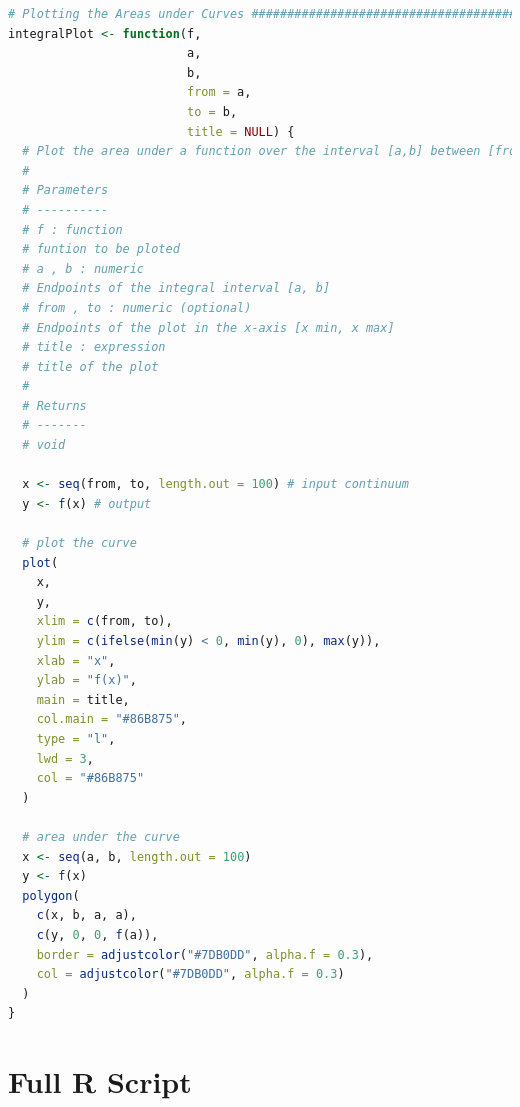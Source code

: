 \documentclass[11pt,a4paper]{article}
\begin{document}
\begin{lstlisting}[frame=trBL, language=R]
# Plotting the Areas under Curves ######################################
integralPlot <- function(f,
                         a,
                         b,
                         from = a,
                         to = b,
                         title = NULL) {
  # Plot the area under a function over the interval [a,b] between [from,to].
  #
  # Parameters
  # ----------
  # f : function
  # funtion to be ploted
  # a , b : numeric
  # Endpoints of the integral interval [a, b]
  # from , to : numeric (optional)
  # Endpoints of the plot in the x-axis [x min, x max]
  # title : expression
  # title of the plot
  #
  # Returns
  # -------
  # void
  
  x <- seq(from, to, length.out = 100) # input continuum
  y <- f(x) # output
  
  # plot the curve
  plot(
    x,
    y,
    xlim = c(from, to),
    ylim = c(ifelse(min(y) < 0, min(y), 0), max(y)),
    xlab = "x",
    ylab = "f(x)",
    main = title,
    col.main = "#86B875",
    type = "l",
    lwd = 3,
    col = "#86B875"
  )
  
  # area under the curve
  x <- seq(a, b, length.out = 100)
  y <- f(x)
  polygon(
    c(x, b, a, a),
    c(y, 0, 0, f(a)),
    border = adjustcolor("#7DB0DD", alpha.f = 0.3),
    col = adjustcolor("#7DB0DD", alpha.f = 0.3)
  )
}
\end{lstlisting}

\clearpage

\section{Full R Script}\label{sec:fullScript}
\end{document}
